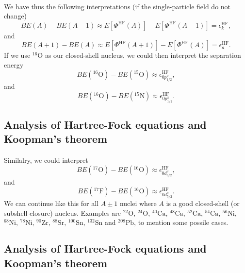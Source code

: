 \documentclass[%
twoside,                 %
final,                   %
10pt]{article}
\begin{document}
\paragraph{}
We have thus the following interpretations (if the single-particle field do not change)
\[
BE(A)-BE(A-1)\approx  E[\Phi^{\mathrm{HF}}(A)]-   E[\Phi^{\mathrm{HF}}(A-1)] 
  = \epsilon_k^{\mathrm{HF}}, 
\]
and
\[
BE(A+1)-BE(A)\approx  E[\Phi^{\mathrm{HF}}(A+1)]-   E[\Phi^{\mathrm{HF}}(A)] =  \epsilon_a^{\mathrm{HF}}. 
\]
If  we use ${}^{16}\mbox{O}$ as our closed-shell nucleus, we could then interpret the separation energy
\[
BE(^{16}\mathrm{O})-BE(^{15}\mathrm{O})\approx \epsilon_{0p^{\nu}_{1/2}}^{\mathrm{HF}}, 
\]
and
\[
BE(^{16}\mathrm{O})-BE(^{15}\mathrm{N})\approx \epsilon_{0p^{\pi}_{1/2}}^{\mathrm{HF}}.
\]



\subsection{Analysis of Hartree-Fock equations and Koopman's theorem}

\paragraph{}
Similalry, we could interpret
\[
BE(^{17}\mathrm{O})-BE(^{16}\mathrm{O})\approx \epsilon_{0d^{\nu}_{5/2}}^{\mathrm{HF}}, 
\]
and 
\[
BE(^{17}\mathrm{F})-BE(^{16}\mathrm{O})\approx\epsilon_{0d^{\pi}_{5/2}}^{\mathrm{HF}}.
\]
We can continue like this for all $A\pm 1$ nuclei where $A$ is a good closed-shell (or subshell closure)
nucleus. Examples are ${}^{22}\mbox{O}$, ${}^{24}\mbox{O}$, ${}^{40}\mbox{Ca}$, ${}^{48}\mbox{Ca}$, ${}^{52}\mbox{Ca}$, ${}^{54}\mbox{Ca}$, ${}^{56}\mbox{Ni}$, 
${}^{68}\mbox{Ni}$, ${}^{78}\mbox{Ni}$, ${}^{90}\mbox{Zr}$, ${}^{88}\mbox{Sr}$, ${}^{100}\mbox{Sn}$, ${}^{132}\mbox{Sn}$ and ${}^{208}\mbox{Pb}$, to mention some possile cases.



\subsection{Analysis of Hartree-Fock equations and Koopman's theorem}

\end{document}
